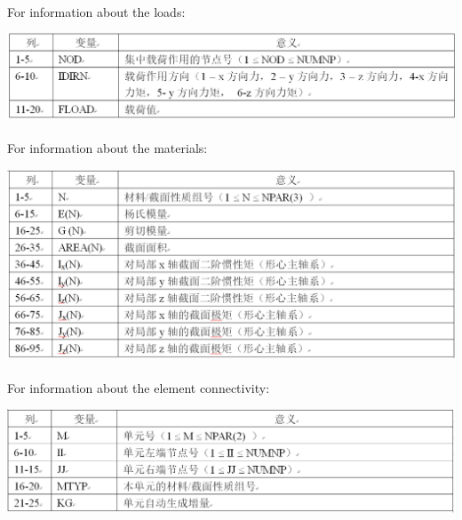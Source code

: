 \documentclass[UTF8]{ctexbook}
\begin{document}
\paragraph{}For information about the loads:
\begin{center}
\includegraphics[width=1.0\textwidth]{beam4.png}
\end{center}
\paragraph{}For information about the materials:
\begin{center}
\includegraphics[width=1.0\textwidth]{beam5.png}
\end{center}
\paragraph{}For information about the element connectivity:
\begin{center}
\includegraphics[width=1.0\textwidth]{beam6.png}
\end{center}
\end{document}
